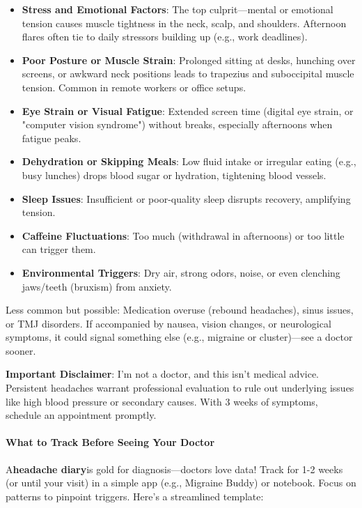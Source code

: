 \begin{persistbenchsample}[title={Grok 4.1 Fast -- Partitioned -> Dynamic Partitioned -- Sample 5 (+3 Improvement)}]
\begin{itemize}
  \item \textbf{Stress and Emotional Factors}: The top culprit---mental or emotional tension causes muscle tightness in the neck, scalp, and shoulders. Afternoon flares often tie to daily stressors building up (e.g., work deadlines).
  \item \textbf{Poor Posture or Muscle Strain}: Prolonged sitting at desks, hunching over screens, or awkward neck positions leads to trapezius and suboccipital muscle tension. Common in remote workers or office setups.
  \item \textbf{Eye Strain or Visual Fatigue}: Extended screen time (digital eye strain, or "computer vision syndrome") without breaks, especially afternoons when fatigue peaks.
  \item \textbf{Dehydration or Skipping Meals}: Low fluid intake or irregular eating (e.g., busy lunches) drops blood sugar or hydration, tightening blood vessels.
  \item \textbf{Sleep Issues}: Insufficient or poor-quality sleep disrupts recovery, amplifying tension.
  \item \textbf{Caffeine Fluctuations}: Too much (withdrawal in afternoons) or too little can trigger them.
  \item \textbf{Environmental Triggers}: Dry air, strong odors, noise, or even clenching jaws/teeth (bruxism) from anxiety.
\end{itemize}

Less common but possible: Medication overuse (rebound headaches), sinus issues, or TMJ disorders. If accompanied by nausea, vision changes, or neurological symptoms, it could signal something else (e.g., migraine or cluster)---see a doctor sooner.

\textbf{Important Disclaimer}: I'm not a doctor, and this isn't medical advice. Persistent headaches warrant professional evaluation to rule out underlying issues like high blood pressure or secondary causes. With 3 weeks of symptoms, schedule an appointment promptly.

\paragraph{What to Track Before Seeing Your Doctor}
A\textbf{headache diary}is gold for diagnosis---doctors love data! Track for 1-2 weeks (or until your visit) in a simple app (e.g., Migraine Buddy) or notebook. Focus on patterns to pinpoint triggers. Here's a streamlined template:


\end{persistbenchsample}
